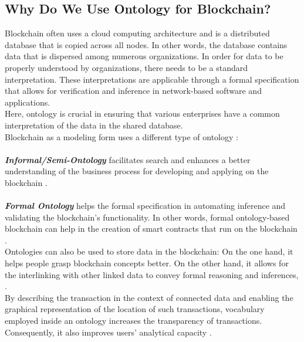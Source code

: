 \subsection{Why Do We Use Ontology for Blockchain?}
Blockchain often uses a cloud computing architecture and is a distributed database that is copied across all nodes. In other words, the database contains data that is dispersed among numerous organizations. In order for data to be properly understood by organizations, there needs to be a standard interpretation. These interpretations are applicable through a formal specification that allows for verification and inference in network-based software and applications. \\
Here, ontology is crucial in ensuring that various enterprises have a common interpretation of the data in the shared database.\\
Blockchain as a modeling form uses a different type of ontology \cite{Kim}: \\
\\
\textbf{\textit{Informal/Semi-Ontology}} facilitates search and enhances a better understanding of the business process for developing and applying on the blockchain \cite{Kim}. \\
\\
\textbf{\textit{Formal Ontology}} helps  the formal specification in automating inference and validating the blockchain's functionality. In other words, formal ontology-based blockchain can help in the creation of smart contracts that run on the blockchain \cite{Kim}. \\
Ontologies can also be used to store data in the blockchain: On the one hand, it helps people grasp blockchain concepts better. On the other hand, it allows for the interlinking with other linked data to convey formal reasoning and inferences, \cite{Kim}. \\
By describing the transaction in the context of connected data and enabling the graphical representation of the location of such transactions, vocabulary employed inside an ontology increases the transparency of transactions. Consequently, it also improves users' analytical capacity \cite{Kim}.
